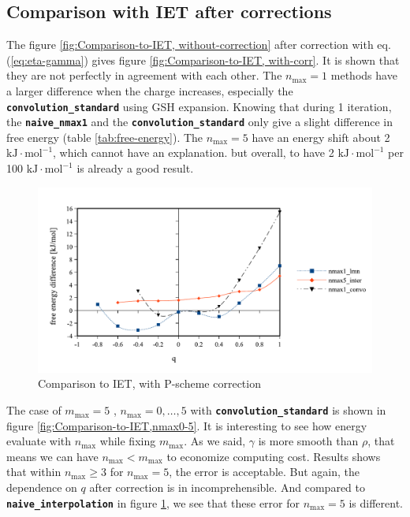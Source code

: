 \subsection{Comparison with IET after corrections}

The figure \ref{fig:Comparison-to-IET, without-correction} after correction
with eq. (\ref{eq:eta-gamma}) gives figure \ref{fig:Comparison-to-IET, with-corr}.
It is shown that they are not perfectly in agreement with each other. The
$n_{\max}=1$ methods have a larger difference when the charge increases,
especially the \texttt{\textbf{convolution\_standard}} using GSH expansion.
Knowing that during 1 iteration, the \texttt{\textbf{naive\_nmax1}}
and the \texttt{\textbf{convolution\_standard}} only give a slight
difference in free energy (table \ref{tab:free-energy}). The $n_{\max}=5$
have an energy shift about 2 $\mathrm{kJ}\cdot\mathrm{mol^{-1}}$,
which cannot have an explanation. but overall, to have 2 $\mathrm{kJ}\cdot\mathrm{mol^{-1}}$
per 100 $\mathrm{kJ}\cdot\mathrm{mol^{-1}}$ is already a good result.

\begin{figure}[H]
\begin{centering}
\includegraphics[bb=0bp 20bp 510bp 263bp,scale=0.6]{_figure/results/ch4_diff_inter}
\par\end{centering}
\caption{Comparison to IET, with P-scheme correction\label{fig:Comparison-to-IET,with-corr}}
\end{figure}

The case of $m_{\max}=5$ , $n_{\max}=0,\ldots,5$ with \texttt{\textbf{convolution\_standard}}
is shown in figure \ref{fig:Comparison-to-IET,nmax0-5}. It is interesting
to see how energy evaluate with $n_{\max}$ while fixing $m_{\max}$.
As we said, $\gamma$ is more smooth than $\rho$, that means we can
have $n_{\max}<m_{\max}$ to economize computing cost. Results shows
that within $n_{\max}\geq3$ for $n_{\max}=5$, the error is acceptable.
But again, the dependence on $q$ after correction is in incomprehensible.
And compared to \texttt{\textbf{naive\_interpolation}} in figure \ref{fig:Comparison-to-IET,with-corr},
we see that these error for $n_{\max}=5$ is different.

